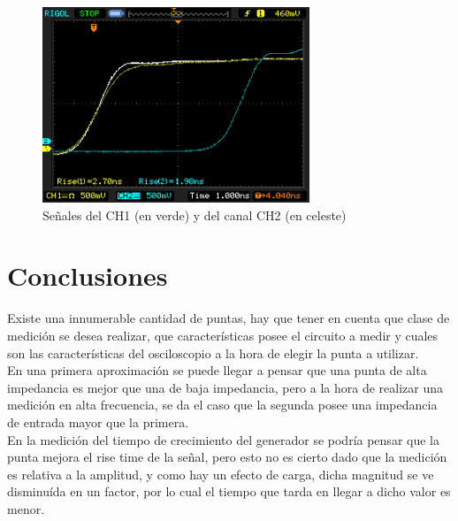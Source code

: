 \documentclass[a4paper,10pt]{article}
\begin{document}
		
		\begin{figure}[!htb]
			\centering
			\includegraphics[width=8cm]{Imagenes/Mediciones instrumentos/NewFile10.png}
			\caption{Se\~nales del CH1 (en verde) y del canal CH2 (en celeste)} \label{img008}
		\end{figure}
	\newpage
	\section{Conclusiones}
	\indent Existe una innumerable cantidad de puntas, hay que tener en cuenta
	que clase de medición se desea realizar, que características posee el 
	circuito a medir y cuales son las características del osciloscopio a la 
	hora de elegir la punta a utilizar. \\
	\indent En una primera aproximación se puede llegar a pensar que una punta
	de alta impedancia es mejor que una de baja impedancia, pero a la hora de
	realizar una medición en alta frecuencia, se da el caso que la segunda 
	posee una impedancia de entrada mayor que la primera.\\
	\indent En la medición del tiempo de crecimiento del generador se podría
	pensar que la punta mejora el rise time de la señal, pero esto no es
	cierto dado que la medición es relativa a la amplitud, y como hay un 
	efecto de carga, dicha magnitud se ve disminuída en un factor, por lo cual
	el tiempo que tarda en llegar a	dicho valor es menor.
\end{document}
